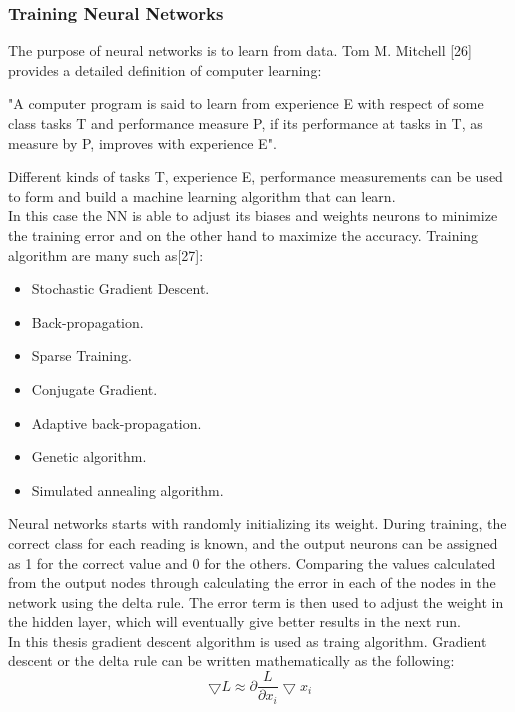 \subsubsection{Training Neural Networks}
\hspace{5mm} The purpose of neural networks is to learn from data. Tom M. Mitchell [26] provides a detailed definition of computer learning:
\begin{displayquote}
"A computer program is said to learn from experience E with respect of some class tasks T and performance measure P, if its performance at tasks in T, as measure by P, improves with experience E".
\end{displayquote}
\hspace{5mm} Different kinds of tasks T, experience E, performance measurements can be used to form and build a machine learning algorithm that can learn.\\
In this case the NN is able to adjust its biases and weights neurons to minimize the training error and on the other hand to maximize the accuracy. Training algorithm are many such as[27]:
\begin{itemize}
    \item Stochastic Gradient Descent.
    \item Back-propagation.
    \item Sparse Training.
    \item Conjugate Gradient.
    \item Adaptive back-propagation.
    \item Genetic algorithm.
    \item Simulated annealing algorithm.
\end{itemize}
\hspace{5mm} Neural networks starts with randomly initializing its weight. During training, the correct class for each reading is known, and the output neurons can be assigned as 1 for the correct value and 0 for the others. Comparing the values calculated from the output nodes through calculating the error in each of the nodes in the network using  the delta rule. The error term is then used to adjust the weight in the hidden layer, which will eventually give better results in the next run.\\

In this thesis gradient descent algorithm is used as traing algorithm. Gradient descent or the delta rule can be written mathematically as the following:
\begin{equation}
\bigtriangledown L \approx \partial \frac{L}{\partial x_{i}}\bigtriangledown x_{i}
\end{equation}


